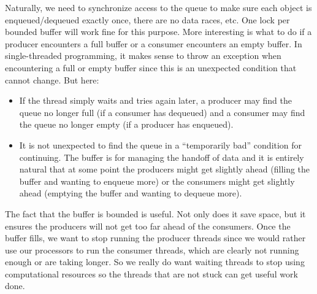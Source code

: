 \documentclass[10pt]{article}
\begin{document}
Naturally, we need to synchronize access to the queue to make sure
each object is enqueued/dequeued exactly once, there are no data
races, etc.  One lock per bounded buffer will work fine for this
purpose.  More interesting is what to do if a producer encounters a
full buffer or a consumer encounters an empty buffer.  In
single-threaded programming, it makes sense to throw an exception when
encountering a full or empty buffer since this is an unexpected
condition that cannot change.  But here:
\begin{itemize}
\item If the thread simply waits and tries again later, a producer may
  find the queue no longer full (if a consumer has dequeued) and a 
  consumer may find the queue no longer empty (if a producer has
  enqueued).
\item It is not unexpected to find the queue in a ``temporarily bad''
  condition for continuing.  The buffer is for managing the handoff of
  data and it is entirely natural that at some point the producers
  might get slightly ahead (filling the buffer and wanting to enqueue
  more) or the consumers might get slightly ahead (emptying the buffer
  and wanting to dequeue more).
\end{itemize}
The fact that the buffer is bounded is useful.  Not only does it save
space, but it ensures the producers will not get too far ahead of the
consumers.  Once the buffer fills, we want to stop running the
producer threads since we would rather use our processors to run the
consumer threads, which are clearly not running enough or are taking
longer.  So we really do want waiting threads to stop using
computational resources so the threads that are not stuck can get
useful work done.
\end{document}
